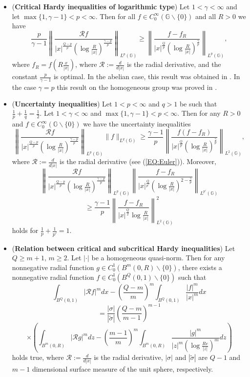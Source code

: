 \documentclass[a4paper,12pt,reqno]{amsart}
\renewcommand\eqref[1]{(\ref{#1})} %
\numberwithin{equation}{section}
\theoremstyle{plain}
\theoremstyle{definition}
\begin{document}
\begin{itemize}
\item ({\bf Critical Hardy inequalities of logarithmic type})
Let $1<\gamma<\infty$ and let $\max\{1,\gamma-1\}<p<\infty$.
Then for all $f\in C_{0}^{\infty}(\mathbb{G}\backslash\{0\})$ and all $R>0$ we have
$$\frac{p}{\gamma-1}\left\|
\frac{\mathcal{R}f}{|x|^{\frac{Q-p}{p}}\left(\log\frac{R}{|x|}\right)^{\frac{\gamma-p}{p}}} \right\|_{L^{p}(\mathbb{G})}
\geq
\left\|\frac{f-f_{R}}{|x|^{\frac{Q}{p}}\left(\log\frac{R}{|x|}\right)^{\frac{\gamma}{p}}}\right\|_{L^{p}(\mathbb{G})},
$$
where $f_{R}=f\left(R\frac{x}{|x|}\right)$,  where $\mathcal{R}:=\frac{d}{d|x|}$ is the radial derivative, and the constant $\frac{p}{\gamma-1}$ is optimal. In the abelian case, this result was obtained in \cite{MOW15}. In the case $\gamma=p$ this result on the homogeneous group was proved in \cite{Ruzhansky-Suragan:critical}.
\item ({\bf Uncertainty inequalities})
Let $1<p<\infty$ and $q>1$ be such that
$\frac{1}{p}+\frac{1}{q}=\frac{1}{2}$. Let $1<\gamma<\infty$ and $\max\{1,\gamma-1\}<p<\infty$. Then for any $R>0$ and $f\in C_{0}^{\infty}(\mathbb{G}\backslash\{0\})$ we have the uncertainty inequalities
$$
\left\|
\frac{\mathcal{R}f}{|x|^{\frac{Q-p}{p}}\left(\log\frac{R}{|x|}\right)^{\frac{\gamma-p}{p}}} \right\|_{L^{p}(\mathbb{G})}\|f\|_{L^{q}(\mathbb{G})}
\geq\frac{\gamma-1}{p}\left\|\frac{f(f-f_{R})}
{|x|^{\frac{Q}{p}}\left(\log\frac{R}{|x|}\right)^{\frac{\gamma}{p}}} \right\|_{L^{2}(\mathbb{G})},
$$
where $\mathcal{R}:=\frac{d}{d|x|}$ is the radial derivative (see \eqref{EQ:Euler}). Moreover,
$$
\left\|
\frac{\mathcal{R}f}{|x|^{\frac{Q-p}{p}}\left(\log\frac{R}{|x|}\right)^{\frac{\gamma-p}{p}}} \right\|_{L^{p}(\mathbb{G})}\left\|\frac{f-f_{R}}
{|x|^{\frac{Q}{p'}}\left(\log\frac{R}{|x|}\right)^{2-\frac{\gamma}{p}}}
\right\|_{L^{p'}(\mathbb{G})}$$$$\geq\frac{\gamma-1}{p}\left\|\frac{f-f_{R}}
{|x|^{\frac{Q}{2}}\log\frac{R}{|x|}}\right\|^{2}_{L^{2}(\mathbb{G})}
$$
holds for $\frac{1}{p}+\frac{1}{p'}=1$.

\item ({\bf Relation between critical and subcritical Hardy inequalities})
Let $Q\geq m+1$, $m\geq2$. Let $|\cdot|$ be a homogeneous quasi-norm. Then for any nonnegative radial function $g\in C_{0}^{1}(B^{m}(0,R)\backslash\{0\})$, there exists a nonnegative radial function $f\in C_{0}^{1}(B^{Q}(0,1)\backslash\{0\})$ such that
$$\int_{B^{Q}(0,1)}|\mathcal{R}f|^{m}dx-\left(\frac{Q-m}{m}\right)^{m}\int_{B^{Q}(0,1)}\frac{|f|^{m}}{|x|^{m}}dx$$
$$
=\frac{|\sigma|}
{|\widetilde{\sigma}|}\left(\frac{Q-m}{m-1}\right)^{m-1}$$
$$\times\left(\int_{B^{m}(0,R)}|\mathcal{R}g|^{m}dz-
\left(\frac{m-1}{m}\right)^{m}\int_{B^{m}(0,R)}\frac{|g|^{m}}{|z|^{m}\left(\log\frac{Re}{|z|}\right)^{m}}dz\right)
$$
holds true, where $\mathcal{R}:=\frac{d}{d|x|}$ is the radial derivative, $|\sigma|$ and $|\widetilde{\sigma}|$ are $Q-1$ and $m-1$ dimensional surface measure of the unit sphere, respectively.
\end{itemize}
\end{document}
